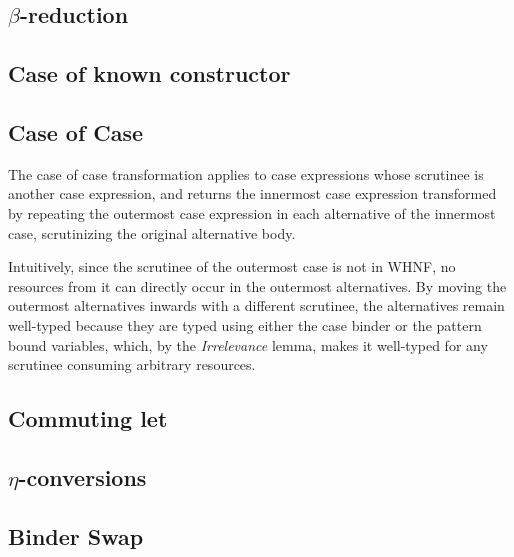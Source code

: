 \documentclass[acmsmall,review,anonymous,screen]{acmart}
\begin{document}
\subsection{\texorpdfstring{$\beta$}{Beta}-reduction}



\subsection{Case of known constructor}



\subsection{Case of Case\label{sec:proof:caseofcase}}

The case of case transformation applies to case expressions whose scrutinee is
another case expression, and returns the innermost case expression transformed by repeating
the outermost case expression in each alternative of the innermost case,
scrutinizing the original alternative body.

Intuitively, since the scrutinee of the outermost case is not in WHNF, no
resources from it can directly occur in the outermost alternatives. By moving
the outermost alternatives inwards with a different scrutinee, the alternatives
remain well-typed because they are typed using either the case binder or the
pattern bound variables, which, by the \emph{Irrelevance} lemma, makes it
well-typed for any scrutinee consuming arbitrary resources.



\subsection{Commuting let}



\subsection{\texorpdfstring{$\eta$}{Eta}-conversions}



\subsection{Binder Swap}
\end{document}
